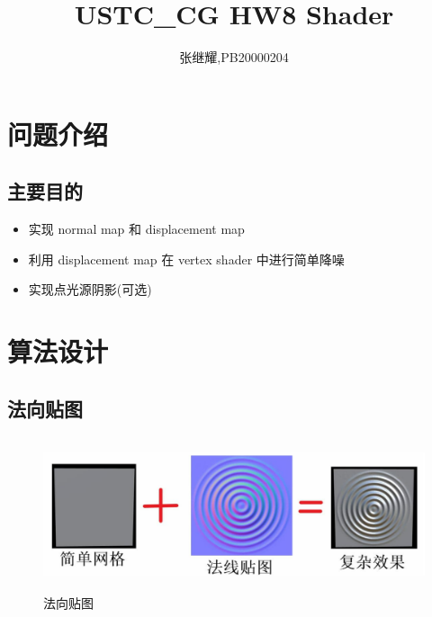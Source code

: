 \documentclass{article}
\title{USTC\_CG HW8 Shader}
\author{张继耀,PB20000204}
\begin{document}
	\maketitle
	
	\tableofcontents
	
	\section {问题介绍}
	\subsection{主要目的}
		\begin{itemize}
		\item 实现 normal map 和 displacement map
	\end{itemize}

	\begin{itemize}
	\item 利用 displacement map 在 vertex shader 中进行简单降噪
\end{itemize}

	\begin{itemize}
	\item 实现点光源阴影(可选)
\end{itemize}

	
	
	\section{算法设计}
	
	\subsection{法向贴图}
			\begin{figure}[H]
		\begin{center}
			
			\includegraphics[width=15cm,height=4.5cm]{faxiang}
			
			\caption{法向贴图}	\label{faxiang.label}
		\end{center}
	\end{figure}
	
\end{document}
